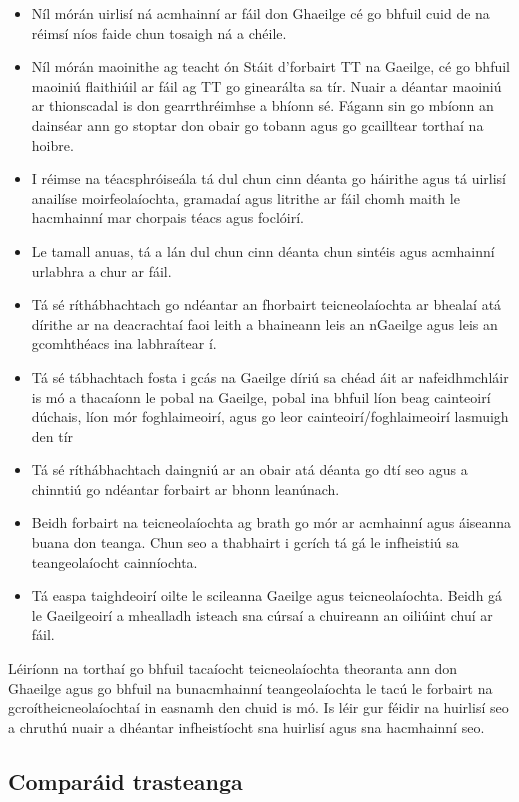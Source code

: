 \begin{multicols}{2}
\begin{itemize}
\item Níl mórán uirlisí ná acmhainní ar fáil don Ghaeilge cé go bhfuil cuid de na réimsí níos faide chun tosaigh ná a chéile.
\item Níl mórán maoinithe ag teacht ón Stáit d’forbairt TT na Gaeilge, cé go bhfuil maoiniú flaithiúil ar fáil ag TT go ginearálta sa tír. Nuair a déantar maoiniú ar thionscadal is don gearrthréimhse a bhíonn sé. Fágann sin go mbíonn an  dainséar ann go stoptar don obair go tobann agus go gcailltear torthaí na hoibre.
\item I réimse na téacsphróiseála tá dul chun cinn déanta go háirithe agus tá uirlisí anailíse moirfeolaíochta, gramadaí agus litrithe ar fáil chomh maith le hacmhainní mar chorpais téacs agus foclóirí.
\item Le tamall anuas, tá a lán dul chun cinn déanta chun sintéis agus acmhainní urlabhra a chur ar fáil.
\item Tá sé ríthábhachtach go ndéantar an fhorbairt teicneolaíochta ar bhealaí atá dírithe ar na deacrachtaí faoi leith a bhaineann leis an nGaeilge agus leis an gcomhthéacs ina labhraítear í.
\item Tá sé tábhachtach fosta i gcás na Gaeilge díriú sa chéad áit ar nafeidhmchláir is mó a thacaíonn le pobal na Gaeilge, pobal ina bhfuil líon beag cainteoirí dúchais, líon mór foghlaimeoirí, agus go leor cainteoirí/foghlaimeoirí lasmuigh den tír
\item Tá sé ríthábhachtach daingniú ar an obair atá déanta go dtí seo agus a chinntiú go ndéantar forbairt ar bhonn leanúnach.
\item Beidh forbairt na teicneolaíochta ag brath go mór ar acmhainní agus áiseanna buana don teanga. Chun seo a thabhairt i gcrích tá gá le infheistiú sa teangeolaíocht cainníochta.
\item Tá easpa taighdeoirí oilte le scileanna Gaeilge agus teicneolaíochta. Beidh gá le Gaeilgeoirí a mhealladh isteach sna cúrsaí a chuireann an oiliúint chuí ar fáil.


\end{itemize}

Léiríonn na torthaí go bhfuil tacaíocht teicneolaíochta theoranta ann don Ghaeilge agus go bhfuil na bunacmhainní teangeolaíochta le tacú le forbairt na gcroítheicneolaíochtaí in easnamh den chuid is mó. Is léir gur féidir na huirlisí seo a chruthú nuair a dhéantar infheistíocht sna huirlisí agus sna hacmhainní seo.


\subsection{Comparáid trasteanga}


\end{multicols}
